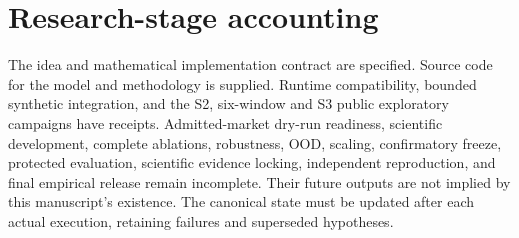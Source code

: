 \documentclass[11pt,a4paper]{article}
\begin{document}
\section{Research-stage accounting}
The idea and mathematical implementation contract are specified. Source code for the model and methodology is supplied. Runtime compatibility, bounded synthetic integration, and the S2, six-window and S3 public exploratory campaigns have receipts. Admitted-market dry-run readiness, scientific development, complete ablations, robustness, OOD, scaling, confirmatory freeze, protected evaluation, scientific evidence locking, independent reproduction, and final empirical release remain incomplete. Their future outputs are not implied by this manuscript's existence. The canonical state must be updated after each actual execution, retaining failures and superseded hypotheses.



\end{document}
